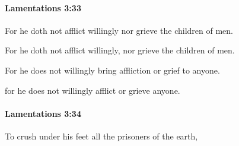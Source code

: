 		\paragraph{Lamentations 3:33} %
			\label{LAMENTATIONS-3-33}

			For he doth not afflict willingly nor grieve the children of men.

			\begin{versebox}
					\item[BHS] 
					\item[LXX] 
					\item[ASV] For he doth not afflict willingly, nor grieve the children of men.
					\item[NIV] For he does not willingly bring affliction or grief to anyone.
					\item[NRSV] for he does not willingly afflict or grieve anyone.
			\end{versebox}

		\paragraph{Lamentations 3:34} %
			\label{LAMENTATIONS-3-34}

			To crush under his feet all the prisoners of the earth,


